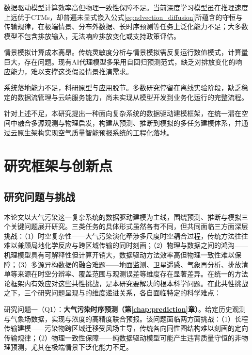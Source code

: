 数据驱动模型计算效率高但物理一致性保障不足。当前深度学习模型虽在推理速度上远优于CTMs，却普遍未显式嵌入公式\eqref{eq:advection_diffusion}所蕴含的守恒与传输规律，在极端情景、分布外数据、长时序预测等任务上泛化能力不足；大多数模型不包含排放输入，无法响应排放变化或支持政策评估。

情景模拟计算成本高昂。传统灵敏度分析与情景模拟需反复运行数值模式，计算量巨大，存在问题。现有AI代理模型多采用自回归预测范式，缺乏对排放变化的响应能力，难以支撑这类假设情景推演需求。

系统落地能力不足，科研原型与应用脱节。多数研究停留在离线实验阶段，缺乏稳定的数据流管理与云端服务能力，尚未实现从模型开发到业务化运行的完整流程。

针对上述不足，本研究提出一种面向复杂系统的数据驱动建模框架，在统一潜在空间中融合多源观测与物理启发，构建从预测、推断到模拟的多任务建模体系，并通过云原生架构实现空气质量智能预报系统的工程化落地。


\section{研究框架与创新点}
\label{sec:framework}

\subsection{研究问题与挑战}
\label{subsec:core_problems}

本论文以大气污染这一复杂系统的数据驱动建模为主线，围绕预测、推断与模拟三个关键问题展开研究。三类任务的具体形式虽然各有不同，但共同面临三方面深层挑战：（1）时空复杂性——大气污染演化牵涉多尺度时空耦合过程，传统方法往往难以兼顾局地化学反应与跨区域传输的同时刻画；（2）物理与数据之间的鸿沟——机理模型具有可解释性但计算开销大，数据驱动方法效率高但物理一致性难以保障；（3）多源异构数据的融合难题——地面监测、卫星遥感、气象再分析、排放清单等来源在时空分辨率、覆盖范围与观测误差等维度存在显著差异。在统一的方法论框架内有效应对这些共性挑战，是本研究要解决的根本科学问题。在此共性挑战之下，三个研究问题呈现与的维度递进关系，各自面临特定的科学难点：

研究问题一（Q1）：\textbf{大气污染时序预测（第\ref{chap:prediction}章）}。给定历史观测与气象场数据，实现\PM 与\ozone 浓度的高精度联合预报。该问题面临两方面挑战：（1）长程传输建模——污染物跨区域迁移受风场主导，传统各向同性图结构难以刻画的定向传输规律；（2）物理一致性保障——纯数据驱动模型可能产生违背质量守恒的非物理预测，尤其在极端情景下泛化能力不足。

